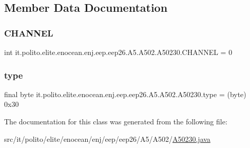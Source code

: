 \subsection{Member Data Documentation}
\hypertarget{classit_1_1polito_1_1elite_1_1enocean_1_1enj_1_1eep_1_1eep26_1_1_a5_1_1_a502_1_1_a50230_a5a59eb332ac1ca5c471532f237335afd}{}\label{classit_1_1polito_1_1elite_1_1enocean_1_1enj_1_1eep_1_1eep26_1_1_a5_1_1_a502_1_1_a50230_a5a59eb332ac1ca5c471532f237335afd} 
\subsubsection{\texorpdfstring{C\+H\+A\+N\+N\+EL}{CHANNEL}}
{\footnotesize\ttfamily int it.\+polito.\+elite.\+enocean.\+enj.\+eep.\+eep26.\+A5.\+A502.\+A50230.\+C\+H\+A\+N\+N\+EL = 0\hspace{0.3cm}{\ttfamily [static]}}

\hypertarget{classit_1_1polito_1_1elite_1_1enocean_1_1enj_1_1eep_1_1eep26_1_1_a5_1_1_a502_1_1_a50230_a092afb56eb2acdcdabafea9afd05f534}{}\label{classit_1_1polito_1_1elite_1_1enocean_1_1enj_1_1eep_1_1eep26_1_1_a5_1_1_a502_1_1_a50230_a092afb56eb2acdcdabafea9afd05f534} 
\subsubsection{\texorpdfstring{type}{type}}
{\footnotesize\ttfamily final byte it.\+polito.\+elite.\+enocean.\+enj.\+eep.\+eep26.\+A5.\+A502.\+A50230.\+type = (byte) 0x30\hspace{0.3cm}{\ttfamily [static]}}



The documentation for this class was generated from the following file\+:\begin{DoxyCompactItemize}
\item 
src/it/polito/elite/enocean/enj/eep/eep26/\+A5/\+A502/\hyperlink{_a50230_8java}{A50230.\+java}\end{DoxyCompactItemize}
